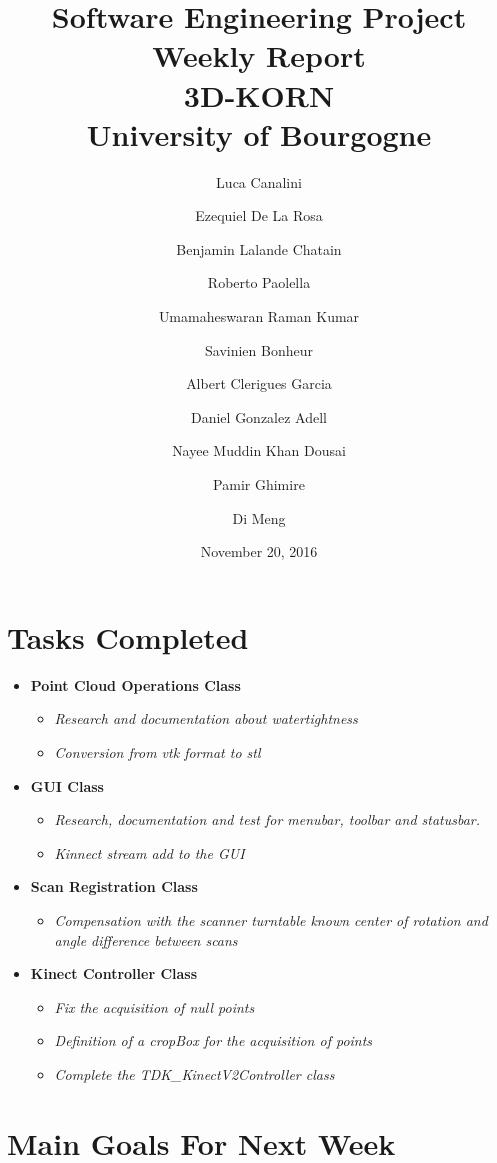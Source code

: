 \documentclass[11pt]{article} %
\title{Software Engineering Project Weekly Report\\ \textbf{3D-KORN} \\ University of Bourgogne}
\author{Luca Canalini \and Ezequiel De La Rosa \and Benjamin Lalande Chatain \and Roberto Paolella \and Umamaheswaran Raman Kumar \and Savinien Bonheur \and Albert Clerigues Garcia \and Daniel Gonzalez Adell \and Nayee Muddin Khan Dousai \and Pamir Ghimire \and Di Meng
}
\date{November 20, 2016} %
\begin{document}
\maketitle
\newpage

\section{Tasks Completed}

\begin{itemize}

\item \textbf{Point Cloud Operations Class}
\begin{itemize}
\item \textit{Research and documentation about watertightness}
\item \textit{Conversion from vtk format to stl}
\end{itemize}

\item \textbf{GUI Class}
\begin{itemize}
\item \textit{Research, documentation and test for menubar, toolbar and statusbar.}
\item \textit{Kinnect stream add to the GUI}
\end{itemize}

\item \textbf{Scan Registration Class}
\begin{itemize}
\item \textit{Compensation with the scanner turntable known center of rotation and angle difference between scans}
\end{itemize}

\item \textbf{Kinect Controller Class}
\begin{itemize}
\item \textit{Fix the acquisition of null points}
\item \textit{Definition of a cropBox for the acquisition of points}
\item \textit{Complete the TDK\_KinectV2Controller class}
\end{itemize}

\end{itemize}

\section{Main Goals For Next Week}
\end{document}
